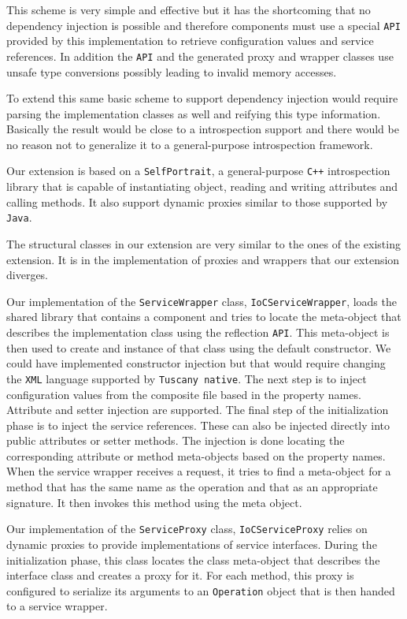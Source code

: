 This scheme is very simple and effective but it has the shortcoming that no dependency injection is possible and
therefore components must use a special \texttt{API} provided by this implementation to retrieve configuration values and
service references. In addition the \texttt{API} and the generated proxy and wrapper classes use unsafe type conversions
possibly leading to invalid memory accesses.

To extend this same basic scheme to support dependency injection would require parsing the implementation classes
as well and reifying this type information. Basically the result would be close to a introspection support
and there would be no reason not to generalize it to a general-purpose introspection framework.

Our extension is based on a \texttt{SelfPortrait}, a general-purpose \texttt{C++} introspection library that is capable
of instantiating object, reading and writing attributes and calling methods. It also support dynamic proxies
similar to those supported by \texttt{Java}.

The structural classes in our extension are very similar to the ones of the existing extension. It is in the
implementation of proxies and wrappers that our extension diverges.

Our implementation of the \texttt{ServiceWrapper} class, \texttt{IoCServiceWrapper}, loads the shared library
that contains a component and tries to locate the meta-object that describes the implementation class using
the reflection \texttt{API}. This meta-object is then used to create and instance of that class using the default constructor.
We could have implemented constructor injection but that would require changing the \texttt{XML} language supported by
\texttt{Tuscany native}. The next step is to inject configuration values from the composite file based in the property names.
Attribute and setter injection are supported. The final step of the initialization phase is to inject the service
references. These can also be injected directly into public attributes or setter methods. The injection is done
locating the corresponding attribute or method meta-objects based on the property names. When the service wrapper
receives a request, it tries to find a meta-object for a method that has the same name as the operation and that
as an appropriate signature. It then invokes this method using the meta object.

Our implementation of the \texttt{ServiceProxy} class, \texttt{IoCServiceProxy} relies on dynamic proxies to provide
implementations of service interfaces. During the initialization phase, this class locates the class meta-object that
describes the interface class and creates a proxy for it. For each method, this proxy is configured to serialize its
arguments to an \texttt{Operation} object that is then handed to a service wrapper.

